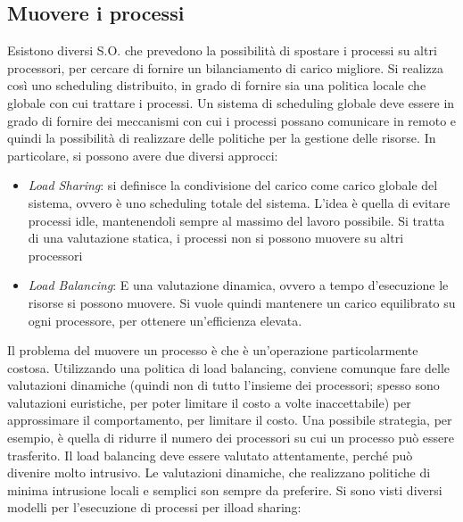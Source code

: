 \subsection{Muovere i processi}
Esistono diversi S.O. che prevedono la possibilità di spostare i processi su altri processori, per cercare di fornire un 
bilanciamento di carico migliore. Si realizza così uno scheduling distribuito, in grado di fornire sia una politica 
locale che globale con cui trattare i processi. Un sistema di scheduling globale deve essere in grado di fornire dei 
meccanismi con cui i processi possano comunicare in remoto e quindi la possibilità di realizzare delle politiche per la 
gestione delle risorse.
In particolare, si possono avere due diversi approcci:
\begin{itemize}
 \item \textit{Load Sharing}: si definisce la condivisione del carico come carico globale del sistema, ovvero è uno 
 scheduling totale del sistema. L'idea è quella di evitare processi idle, mantenendoli sempre al massimo del lavoro 
 possibile. Si tratta di una valutazione statica, i processi non si possono muovere su altri processori
 \item \textit{Load Balancing}: E una valutazione dinamica, ovvero a tempo d'esecuzione le risorse si possono muovere. 
 Si vuole quindi mantenere un carico equilibrato su ogni processore, per ottenere un'efficienza elevata.
\end{itemize}
Il problema del muovere un processo è che è un'operazione particolarmente costosa. Utilizzando una politica di load 
balancing, conviene comunque fare delle valutazioni dinamiche (quindi non di tutto l'insieme dei processori; spesso sono
valutazioni euristiche, per poter limitare il costo a volte inaccettabile) per approssimare il comportamento, per
limitare il costo. Una possibile strategia, per esempio, è quella di ridurre il numero dei processori su cui un processo 
può essere trasferito. Il load balancing deve essere valutato attentamente, perché può divenire molto intrusivo. Le 
valutazioni dinamiche, che realizzano politiche di minima intrusione locali e semplici son sempre da preferire.
Si sono visti diversi modelli per l'esecuzione di processi per ilload sharing:
